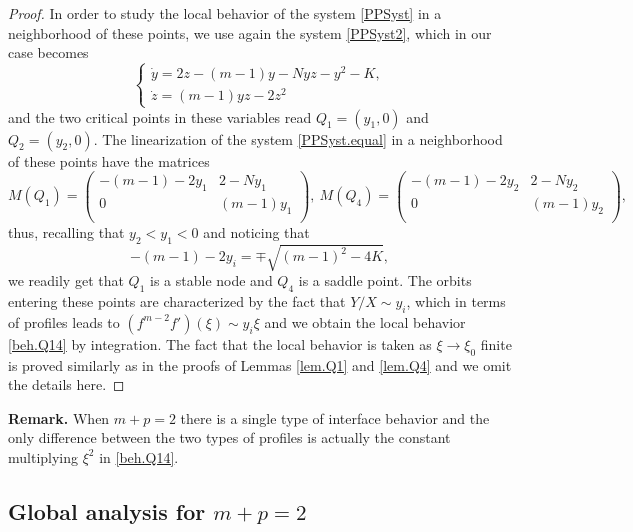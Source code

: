 \documentclass[a4paper,11pt]{article}
\numberwithin{equation}{section}
\begin{document}
\begin{proof}
In order to study the local behavior of the system \eqref{PPSyst} in a neighborhood of these points, we use again the system \eqref{PPSyst2}, which in our case becomes
\begin{equation}\label{PPSyst.equal}
\left\{\begin{array}{ll}\dot{y}=2z-(m-1)y-Nyz-y^2-K, \\ \dot{z}=(m-1)yz-2z^2\end{array}\right.
\end{equation}
and the two critical points in these variables read $Q_1=(y_1,0)$ and $Q_2=(y_2,0)$. The linearization of the system \eqref{PPSyst.equal} in a neighborhood of these points have the matrices
$$
M(Q_1)=\left(
  \begin{array}{cc}
    -(m-1)-2y_1 & 2-Ny_1 \\
    0 & (m-1)y_1 \\
  \end{array}
\right), \ M(Q_4)=\left(
  \begin{array}{cc}
    -(m-1)-2y_2 & 2-Ny_2 \\
    0 & (m-1)y_2 \\
  \end{array}
\right),
$$
thus, recalling that $y_2<y_1<0$ and noticing that
$$
-(m-1)-2y_i=\mp\sqrt{(m-1)^2-4K},
$$
we readily get that $Q_1$ is a stable node and $Q_4$ is a saddle point. The orbits entering these points are characterized by the fact that $Y/X\sim y_i$, which in terms of profiles leads to $(f^{m-2}f')(\xi)\sim y_i\xi$ and we obtain the local behavior \eqref{beh.Q14} by integration. The fact that the local behavior is taken as $\xi\to\xi_0$ finite is proved similarly as in the proofs of Lemmas \ref{lem.Q1} and \ref{lem.Q4} and we omit the details here.
\end{proof}

\noindent \textbf{Remark.} When $m+p=2$ there is a single type of interface behavior and the only difference between the two types of profiles is actually the constant multiplying $\xi^2$ in \eqref{beh.Q14}.

\subsection{Global analysis for $m+p=2$}\label{subsec.globalequal}
\end{document}
